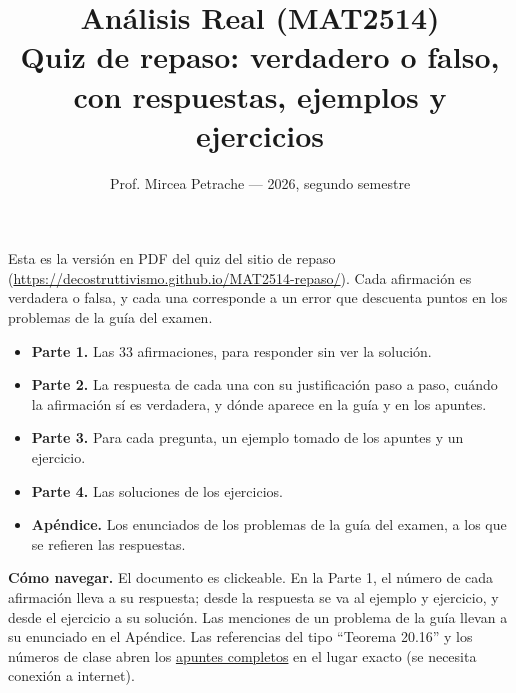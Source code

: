 \documentclass[11pt,a4paper]{article}
\title{Análisis Real (MAT2514)\\[4pt]\large Quiz de repaso: verdadero o falso, con respuestas, ejemplos y ejercicios}
\author{Prof. Mircea Petrache --- 2026, segundo semestre}
\date{}
\begin{document}
\maketitle
\thispagestyle{empty}
\noindent Esta es la versión en PDF del quiz del sitio de repaso
(\url{https://decostruttivismo.github.io/MAT2514-repaso/}).
Cada afirmación es verdadera o falsa, y cada una corresponde a un error que descuenta puntos en los problemas de la guía del examen.

\begin{itemize}[leftmargin=1.4em,itemsep=1pt]
\item \textbf{Parte 1.} Las 33 afirmaciones, para responder sin ver la solución.
\item \textbf{Parte 2.} La respuesta de cada una con su justificación paso a paso, cuándo la afirmación sí es verdadera, y dónde aparece en la guía y en los apuntes.
\item \textbf{Parte 3.} Para cada pregunta, un ejemplo tomado de los apuntes y un ejercicio.
\item \textbf{Parte 4.} Las soluciones de los ejercicios.
\item \textbf{Apéndice.} Los enunciados de los problemas de la guía del examen, a los que se refieren las respuestas.
\end{itemize}
\textbf{Cómo navegar.} El documento es clickeable. En la Parte 1, el número de cada afirmación lleva a su respuesta; desde la respuesta se va al ejemplo y ejercicio, y desde el ejercicio a su solución. Las menciones de un problema de la guía llevan a su enunciado en el Apéndice. Las referencias del tipo ``Teorema 20.16'' y los números de clase abren los \href{https://decostruttivismo.github.io/MAT2514-repaso/pdf/MAT2514_apuntes_completos.pdf}{apuntes completos} en el lugar exacto (se necesita conexión a internet).
\end{document}
